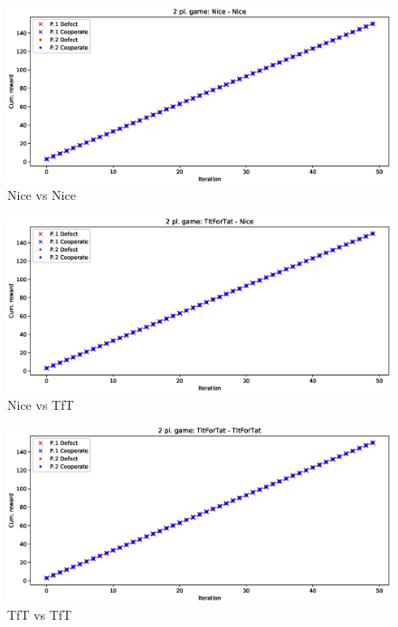 \documentclass[journal,10pt,twoside]{IEEEtran}
\begin{document}
\begin{figure}[!ht]
    \centering
    \includegraphics[width=1\columnwidth]{../img/ipd2p/ipd2p-rewards-Nice-Nice}
    \caption{Nice vs Nice}
    \label{fig:nicevsnice}
\end{figure}

\begin{figure}[!ht]
    \centering
    \includegraphics[width=1\columnwidth]{../img/ipd2p/ipd2p-rewards-TitForTat-Nice}
    \caption{Nice vs TfT}
    \label{fig:nicevstft}
\end{figure}

\begin{figure}[!ht]
    \centering
    \includegraphics[width=1\columnwidth]{../img/ipd2p/ipd2p-rewards-TitForTat-TitForTat}
    \caption{TfT vs TfT}
    \label{fig:tftvstft}
\end{figure}
\end{document}
